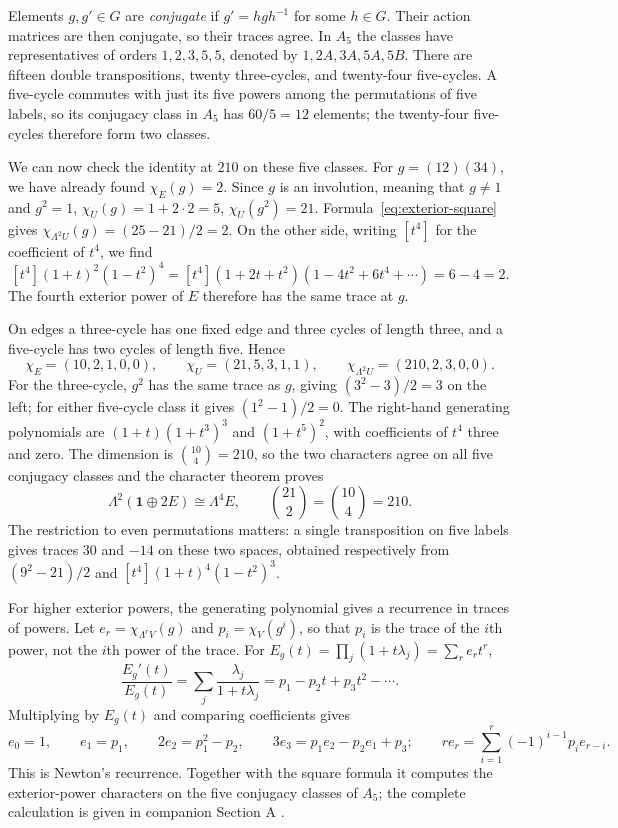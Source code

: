 \documentclass[11pt,a4paper]{article}
\begin{document}
Elements \(g,g'\in G\) are \emph{conjugate} if \(g'=hgh^{-1}\) for some \(h\in G\). Their action matrices are then conjugate, so their traces agree. In \(A_5\) the classes have representatives of orders \(1,2,3,5,5\), denoted by \(1,2A,3A,5A,5B\). There are fifteen double transpositions, twenty three-cycles, and twenty-four five-cycles. A five-cycle commutes with just its five powers among the permutations of five labels, so its conjugacy class in \(A_5\) has \(60/5=12\) elements; the twenty-four five-cycles therefore form two classes.

We can now check the identity at \(210\) on these five classes. For \(g=(12)(34)\), we have already found \(\chi_E(g)=2\). Since \(g\) is an involution, meaning that \(g\ne1\) and \(g^2=1\), \(\chi_U(g)=1+2\cdot2=5\), \(\chi_U(g^2)=21\). Formula~\eqref{eq:exterior-square} gives \(\chi_{\Lambda^2U}(g)=(25-21)/2=2\). On the other side, writing \([t^4]\) for the coefficient of \(t^4\), we find
\[
[t^4](1+t)^2(1-t^2)^4
=[t^4](1+2t+t^2)(1-4t^2+6t^4+\cdots)
=6-4=2.
\]
The fourth exterior power of \(E\) therefore has the same trace at \(g\).

On edges a three-cycle has one fixed edge and three cycles of length three, and a five-cycle has two cycles of length five. Hence
\[
\chi_E=(10,2,1,0,0),\qquad
\chi_U=(21,5,3,1,1),\qquad
\chi_{\Lambda^2U}=(210,2,3,0,0).
\]
For the three-cycle, \(g^2\) has the same trace as \(g\), giving \((3^2-3)/2=3\) on the left; for either five-cycle class it gives \((1^2-1)/2=0\). The right-hand generating polynomials are \((1+t)(1+t^3)^3\) and \((1+t^5)^2\), with coefficients of \(t^4\) three and zero. The dimension is \(\binom{10}{4}=210\), so the two characters agree on all five conjugacy classes and the character theorem proves
\[
\Lambda^2(\mathbf1\oplus2E)\cong\Lambda^4E,
\qquad\binom{21}{2}=\binom{10}{4}=210.
\]
The restriction to even permutations matters: a single transposition on five labels gives traces \(30\) and \(-14\) on these two spaces, obtained respectively from \((9^2-21)/2\) and \([t^4](1+t)^4(1-t^2)^3\).

For higher exterior powers, the generating polynomial gives a recurrence in traces of powers. Let \(e_r=\chi_{\Lambda^rV}(g)\) and \(p_i=\chi_V(g^i)\), so that \(p_i\) is the trace of the \(i\)th power, not the \(i\)th power of the trace. For \(E_g(t)=\prod_j(1+t\lambda_j)=\sum_r e_rt^r\),
\[
\frac{E_g'(t)}{E_g(t)}
=\sum_j\frac{\lambda_j}{1+t\lambda_j}
=p_1-p_2t+p_3t^2-\cdots.
\]
Multiplying by \(E_g(t)\) and comparing coefficients gives
\[
e_0=1,\qquad e_1=p_1,\qquad
2e_2=p_1^2-p_2,\qquad
3e_3=p_1e_2-p_2e_1+p_3;
\qquad
re_r=\sum_{i=1}^{r}(-1)^{i-1}p_i e_{r-i}.
\]
This is Newton's recurrence. Together with the square formula it computes the exterior-power characters on the five conjugacy classes of \(A_5\); the complete calculation is given in companion Section A \citep{Companion2026}.
\end{document}
